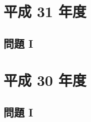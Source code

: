 \documentclass[report]{dennou777}
\date{\warekitoday}
\begin{document}
\maketitle

\chapter{平成 31 年度}
\section{問題 I}

\chapter{平成 30 年度}
\section{問題 I}
\end{document}
